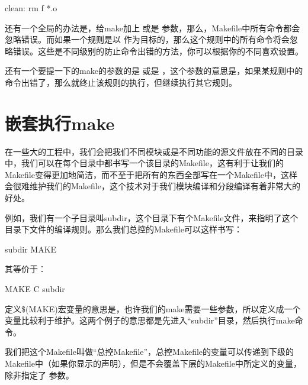 \documentclass[a4paper,10pt]{sphinxmanual}
\begin{document}
\begin{sphinxVerbatim}[commandchars=\\\{\}]
clean:
    \PYGZhy{}rm \PYGZhy{}f *.o
\end{sphinxVerbatim}

还有一个全局的办法是，给make加上  或是  参数，那么，Makefile中所有命令都会忽略错误。而如果一个规则是以  作为目标的，那么这个规则中的所有命令将会忽略错误。这些是不同级别的防止命令出错的方法，你可以根据你的不同喜欢设置。

还有一个要提一下的make的参数的是  或是  ，这个参数的意思是，如果某规则中的命令出错了，那么就终止该规则的执行，但继续执行其它规则。


\section{嵌套执行make}
\label{\detokenize{recipes:make}}
在一些大的工程中，我们会把我们不同模块或是不同功能的源文件放在不同的目录中，我们可以在每个目录中都书写一个该目录的Makefile，这有利于让我们的Makefile变得更加地简洁，而不至于把所有的东西全部写在一个Makefile中，这样会很难维护我们的Makefile，这个技术对于我们模块编译和分段编译有着非常大的好处。

例如，我们有一个子目录叫subdir，这个目录下有个Makefile文件，来指明了这个目录下文件的编译规则。那么我们总控的Makefile可以这样书写：

\begin{sphinxVerbatim}[commandchars=\\\{\}]
     subdir  MAKE
\end{sphinxVerbatim}

其等价于：

\begin{sphinxVerbatim}[commandchars=\\\{\}]
    MAKE \PYGZhy{}C subdir
\end{sphinxVerbatim}

定义\$(MAKE)宏变量的意思是，也许我们的make需要一些参数，所以定义成一个变量比较利于维护。这两个例子的意思都是先进入“subdir”目录，然后执行make命令。

我们把这个Makefile叫做“总控Makefile”，总控Makefile的变量可以传递到下级的Makefile中（如果你显示的声明），但是不会覆盖下层的Makefile中所定义的变量，除非指定了  参数。
\end{document}
